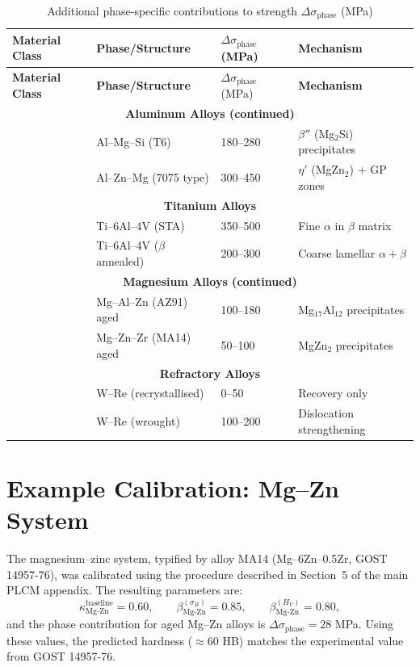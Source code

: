 \documentclass[12pt,a4paper]{article}
\begin{document}
	\begin{longtable}{p{3.5cm} p{3.0cm} p{3.0cm} p{4cm}}
		\caption{Additional phase-specific contributions to strength $\Delta\sigma_{\text{phase}}$ (MPa)}\label{tab:phase_contrib_extended}\\
		\toprule
		\textbf{Material Class} & \textbf{Phase/Structure} & $\Delta\sigma_{\text{phase}}$ (MPa) & \textbf{Mechanism} \\
		\midrule
		\endfirsthead
		\toprule
		\textbf{Material Class} & \textbf{Phase/Structure} & $\Delta\sigma_{\text{phase}}$ (MPa) & \textbf{Mechanism} \\
		\midrule
		\endhead
		\multicolumn{4}{c}{\textbf{Aluminum Alloys (continued)}} \\
		& Al–Mg–Si (T6) & 180–280 & $\beta''$ (Mg$_2$Si) precipitates \\
		& Al–Zn–Mg (7075 type) & 300–450 & $\eta'$ (MgZn$_2$) + GP zones \\
		\hline
		\multicolumn{4}{c}{\textbf{Titanium Alloys}} \\
		& Ti–6Al–4V (STA) & 350–500 & Fine $\alpha$ in $\beta$ matrix \\
		& Ti–6Al–4V ($\beta$ annealed) & 200–300 & Coarse lamellar $\alpha+\beta$ \\
		\hline
		\multicolumn{4}{c}{\textbf{Magnesium Alloys (continued)}} \\
		& Mg–Al–Zn (AZ91) aged & 100–180 & Mg$_{17}$Al$_{12}$ precipitates \\
		& Mg–Zn–Zr (MA14) aged & 50–100 & MgZn$_2$ precipitates \\
		\hline
		\multicolumn{4}{c}{\textbf{Refractory Alloys}} \\
		& W–Re (recrystallised) & 0–50 & Recovery only \\
		& W–Re (wrought) & 100–200 & Dislocation strengthening \\
		\bottomrule
	\end{longtable}
	
	\section{Example Calibration: Mg–Zn System}
	The magnesium–zinc system, typified by alloy MA14 (Mg–6Zn–0.5Zr, GOST 14957-76), was calibrated using the procedure described in Section~5 of the main PLCM appendix. The resulting parameters are:
	\[
	\kappa_{\text{Mg-Zn}}^{\text{baseline}} = 0.60,\qquad
	\beta_{\text{Mg-Zn}}^{(\sigma_B)} = 0.85,\qquad
	\beta_{\text{Mg-Zn}}^{(H_V)} = 0.80,
	\]
	and the phase contribution for aged Mg–Zn alloys is $\Delta\sigma_{\text{phase}} = 28$ MPa. Using these values, the predicted hardness ($\approx 60$ HB) matches the experimental value from GOST 14957-76.
	
\end{document}
